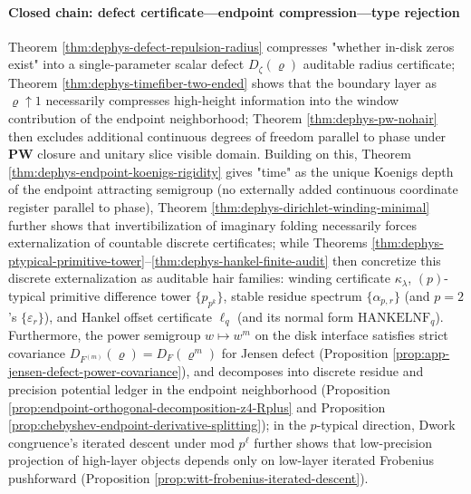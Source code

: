 \paragraph{Closed chain: defect certificate—endpoint compression—type rejection}
Theorem \ref{thm:dephys-defect-repulsion-radius} compresses "whether in-disk zeros exist" into a single-parameter scalar defect \(D_{\zeta}(\varrho)\) auditable radius certificate;
Theorem \ref{thm:dephys-timefiber-two-ended} shows that the boundary layer as \(\varrho\uparrow 1\) necessarily compresses high-height information into the window contribution of the endpoint neighborhood;
Theorem \ref{thm:dephys-pw-nohair} then excludes additional continuous degrees of freedom parallel to phase under \(\mathbf{PW}\) closure and unitary slice visible domain.
Building on this, Theorem \ref{thm:dephys-endpoint-koenigs-rigidity} gives "time" as the unique Koenigs depth of the endpoint attracting semigroup (no externally added continuous coordinate register parallel to phase), Theorem \ref{thm:dephys-dirichlet-winding-minimal} further shows that invertibilization of imaginary folding necessarily forces externalization of countable discrete certificates; while Theorems \ref{thm:dephys-ptypical-primitive-tower}--\ref{thm:dephys-hankel-finite-audit} then concretize this discrete externalization as auditable hair families: winding certificate \(\kappa_{\lambda}\), \((p)\)-typical primitive difference tower \(\{p_{p^k}\}\), stable residue spectrum \(\{\alpha_{p,r}\}\) (and \(p=2\)'s \(\{\varepsilon_r\}\)), and Hankel offset certificate \(\ell_q\) (and its normal form \(\mathrm{HANKELNF}_q\)).
Furthermore, the power semigroup \(w\mapsto w^m\) on the disk interface satisfies strict covariance \(D_{F^{(m)}}(\varrho)=D_F(\varrho^m)\) for Jensen defect (Proposition \ref{prop:app-jensen-defect-power-covariance}), and decomposes into discrete residue and precision potential ledger in the endpoint neighborhood (Proposition \ref{prop:endpoint-orthogonal-decomposition-z4-Rplus} and Proposition \ref{prop:chebyshev-endpoint-derivative-splitting}); in the \(p\)-typical direction, Dwork congruence's iterated descent under mod \(p^\ell\) further shows that low-precision projection of high-layer objects depends only on low-layer iterated Frobenius pushforward (Proposition \ref{prop:witt-frobenius-iterated-descent}).

